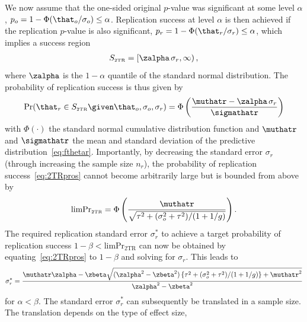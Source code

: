 We now assume that the one-sided original $p$-value was significant at some
level $\alpha$, \ie{} $p_{o} = 1 - \Phi(\that_{o}/\sigma_{o}) \leq \alpha$.
Replication success at level $\alpha$ %
is then achieved if the replication $p$-value is also significant, \ie{}
$p_{r} = 1 - \Phi(\that_{r}/\sigma_{r}) \leq \alpha$, which implies a success
region
\begin{align*}
  S_{\scriptscriptstyle \text{2TR}}
  = \left[\zalpha\, \sigma_{r}, \infty \right),
\end{align*}
where $\zalpha$ is the $1 - \alpha$ quantile of the standard
normal distribution. The probability of replication success is thus given by
\begin{align}
  \label{eq:2TRpros}
  \Pr(\that_{r} \in S_{\scriptscriptstyle \text{2TR}} \given \that_{o}, \sigma_{o}, \sigma_{r})
  = %
  \Phi\left(\frac{\muthatr - \zalpha \, \sigma_{r}}{\sigmathatr}\right)
\end{align}
with $\Phi(\cdot)$ the standard normal cumulative distribution function and
$\muthatr$ and $\sigmathatr$ the mean and standard deviation of the predictive
distribution~\eqref{eq:fthetar}. %
Importantly, by decreasing the standard error $\sigma_{r}$ (through increasing
the sample size $n_{r}$), the probability of replication
success~\eqref{eq:2TRpros} cannot become arbitrarily large but is bounded from
above by
\begin{align}
  \label{eq:limP2TR}
  \text{limPr}_{\scriptscriptstyle \text{2TR}} =
  \Phi\left(\frac{ \muthatr}{\sqrt{
\tau^{2} + (\sigma^{2}_{o} + \tau^{2})/(1 + 1/g)}}\right).
\end{align}
The required replication standard error $\sigma_{r}^{*}$ to achieve a target
probability of replication success
$1 - \beta < \text{limPr}_{\scriptscriptstyle \text{2TR}}$ can now be obtained
by equating~\eqref{eq:2TRpros} to $1 - \beta$ and solving for $\sigma_{r}$. This
leads to
\begin{align}
  \label{eq:ssd2tr}
  \sigma_{r}^{*} =
  \frac{\muthatr \zalpha - \zbeta\sqrt{
  (\zalpha^{2} - \zbeta^{2})\left\{\tau^{2} + (\sigma^{2}_{o} +
  \tau^{2})/(1 + 1/g)\right\} + \muthatr^{2}}}{\zalpha^{2} - \zbeta^{2}}
\end{align}
for $\alpha < \beta$. The standard error $\sigma_{r}^{*}$ can subsequently be
translated in a sample size. The translation depends on the type of effect size,
